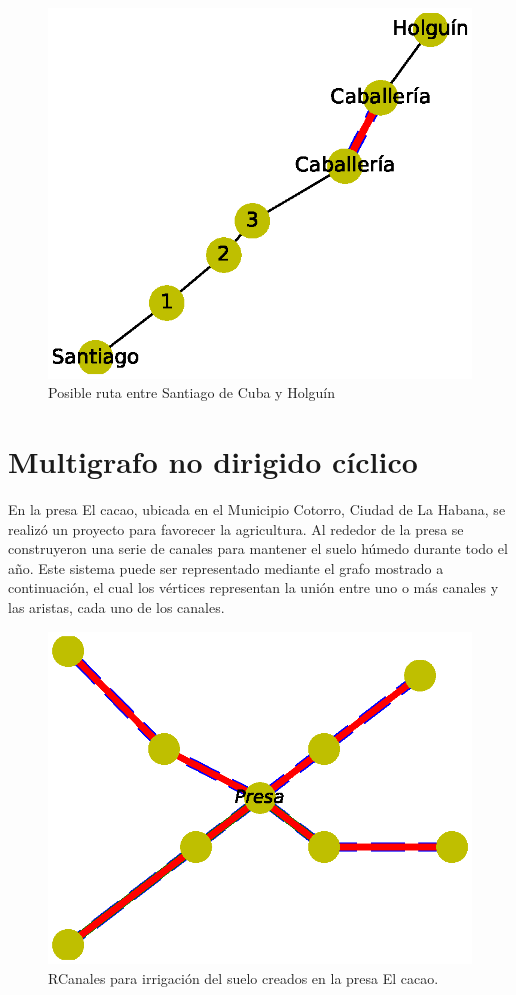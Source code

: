 \documentclass{article}
\begin{document}

\begin{figure}
  \includegraphics[width=.8\columnwidth]{7.eps}
  \caption{Posible ruta entre Santiago de Cuba y Holguín}
  \label{fig:7}
\end{figure}

\section{Multigrafo no dirigido cíclico}

En la presa El cacao, ubicada en el Municipio Cotorro, Ciudad de La Habana, se realizó un proyecto para favorecer la agricultura. Al rededor de la presa se construyeron una serie de canales para mantener el suelo húmedo durante todo el año.
Este sistema puede ser representado mediante el grafo mostrado a continuación, el cual los vértices representan la unión entre uno o más canales y las aristas, cada uno de los canales.



\begin{figure}
  \includegraphics[width=.8\columnwidth]{8.eps}
  \caption{RCanales para irrigación del suelo creados en la presa El cacao.}
  \label{fig:8}
\end{figure}
\end{document}
